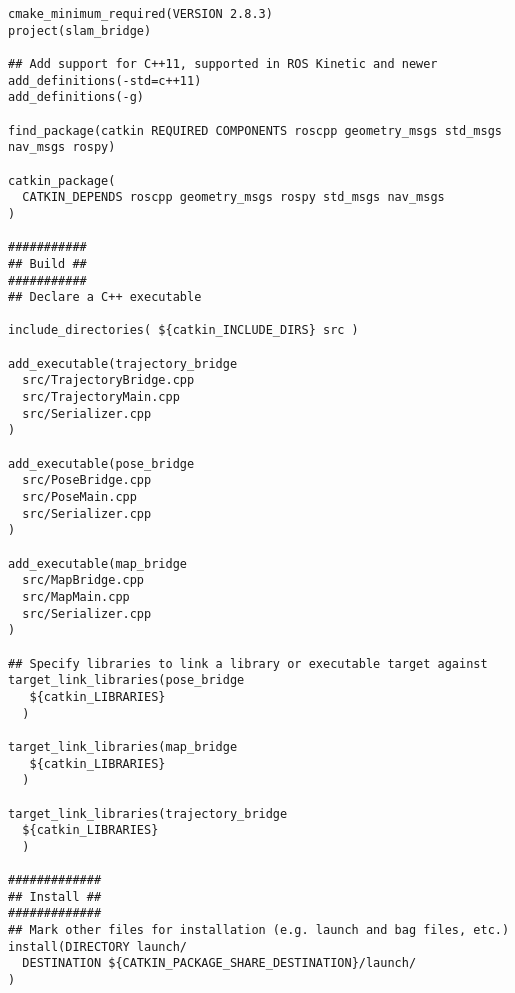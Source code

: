 \begin{lstlisting}
cmake_minimum_required(VERSION 2.8.3)
project(slam_bridge)

## Add support for C++11, supported in ROS Kinetic and newer
add_definitions(-std=c++11)
add_definitions(-g)

find_package(catkin REQUIRED COMPONENTS roscpp geometry_msgs std_msgs nav_msgs rospy)

catkin_package(
  CATKIN_DEPENDS roscpp geometry_msgs rospy std_msgs nav_msgs
)

###########
## Build ##
###########
## Declare a C++ executable

include_directories( ${catkin_INCLUDE_DIRS} src )

add_executable(trajectory_bridge
  src/TrajectoryBridge.cpp
  src/TrajectoryMain.cpp
  src/Serializer.cpp
)

add_executable(pose_bridge
  src/PoseBridge.cpp
  src/PoseMain.cpp
  src/Serializer.cpp
)

add_executable(map_bridge
  src/MapBridge.cpp
  src/MapMain.cpp
  src/Serializer.cpp
)

## Specify libraries to link a library or executable target against
target_link_libraries(pose_bridge
   ${catkin_LIBRARIES}
  )

target_link_libraries(map_bridge
   ${catkin_LIBRARIES}
  )

target_link_libraries(trajectory_bridge 
  ${catkin_LIBRARIES}
  )

#############
## Install ##
#############
## Mark other files for installation (e.g. launch and bag files, etc.)
install(DIRECTORY launch/
  DESTINATION ${CATKIN_PACKAGE_SHARE_DESTINATION}/launch/
)
\end{lstlisting}